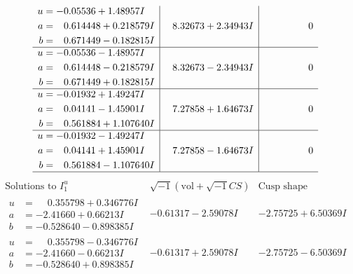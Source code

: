 \documentclass[1p]{elsarticle_modified}
\theoremstyle{definition}
\newcommand{\I}{\sqrt{-1}}
\begin{document}
$$\begin{array}{c|c|c}
\begin{aligned}
u &= -0.05536 + 1.48957 I \\
a &= \phantom{-}0.614448 + 0.218579 I \\
b &= \phantom{-}0.671449 - 0.182815 I\end{aligned}
 & \phantom{-}8.32673 + 2.34943 I & \phantom{-0.000000 } 0 \\ \hline\begin{aligned}
u &= -0.05536 - 1.48957 I \\
a &= \phantom{-}0.614448 - 0.218579 I \\
b &= \phantom{-}0.671449 + 0.182815 I\end{aligned}
 & \phantom{-}8.32673 - 2.34943 I & \phantom{-0.000000 } 0 \\ \hline\begin{aligned}
u &= -0.01932 + 1.49247 I \\
a &= \phantom{-}0.04141 - 1.45901 I \\
b &= \phantom{-}0.561884 + 1.107640 I\end{aligned}
 & \phantom{-}7.27858 + 1.64673 I & \phantom{-0.000000 } 0 \\ \hline\begin{aligned}
u &= -0.01932 - 1.49247 I \\
a &= \phantom{-}0.04141 + 1.45901 I \\
b &= \phantom{-}0.561884 - 1.107640 I\end{aligned}
 & \phantom{-}7.27858 - 1.64673 I & \phantom{-0.000000 } 0\\
 \hline 
 \end{array}$$\newpage$$\begin{array}{c|c|c}  
\text{Solutions to }I^u_{1}& \I (\text{vol} + \sqrt{-1}CS) & \text{Cusp shape}\\
 \hline 
\begin{aligned}
u &= \phantom{-}0.355798 + 0.346776 I \\
a &= -2.41660 + 0.66213 I \\
b &= -0.528640 - 0.898385 I\end{aligned}
 & -0.61317 - 2.59078 I & -2.75725 + 6.50369 I \\ \hline\begin{aligned}
u &= \phantom{-}0.355798 - 0.346776 I \\
a &= -2.41660 - 0.66213 I \\
b &= -0.528640 + 0.898385 I\end{aligned}
 & -0.61317 + 2.59078 I & -2.75725 - 6.50369 I \\ \hline\begin{aligned}

\end{aligned}
\end{array}$$
\end{document}

